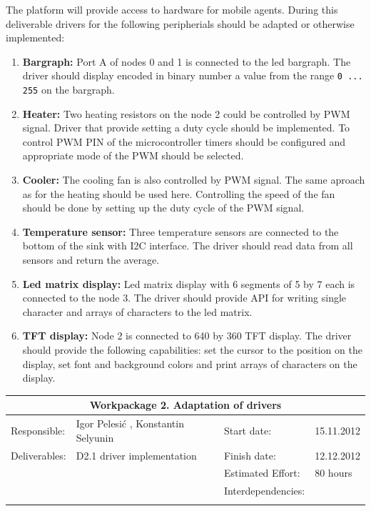 \documentclass{scrreprt}
\begin{document}
The platform will provide access to hardware for mobile agents.
During this deliverable drivers for the following peripherials should be adapted or otherwise implemented:
\begin{enumerate}

\item{\textbf{Bargraph:} Port A of nodes 0 and 1 is connected to the led bargraph.
The driver should display encoded in binary number a value from the range \texttt{0 ... 255} on the bargraph.
}


\item{\textbf{Heater:} Two heating resistors on the node 2 could be controlled by PWM signal.
Driver that provide setting a duty cycle should be implemented.
To control PWM PIN of the microcontroller timers should be configured and appropriate mode of the PWM should be selected.
}

\item{\textbf{Cooler:} The cooling fan is also controlled by PWM signal.
The same aproach as for the heating should be used here.
Controlling the speed of the fan should be done by setting up the duty cycle of the PWM signal.
}

\item{\textbf{Temperature sensor:} 
Three temperature sensors are connected to the bottom of the sink with I2C interface.
The driver should read data from all sensors and return the average.
}

\item{\textbf{Led matrix display:} 
Led matrix display with 6 segments of 5 by 7 each is connected to the node 3.
The driver should provide API for writing single character and arrays of characters to the led matrix.
}

\item{\textbf{TFT display:} 
Node 2 is connected to 640 by 360 TFT display.
The driver should provide the following capabilities: 
set the cursor to the position on the display,
set font and background colors and print arrays of characters on the display.
}
\end{enumerate}

\vspace{0.2in}
\begin{tabular}{|ll|ll|}
\hline \multicolumn{4}{|c|}{\textbf{Workpackage 2. Adaptation of drivers}}\\
\hline
Responsible:	&  Igor Pelesi\'c , Konstantin Selyunin	& Start date:		& 15.11.2012 \\
Deliverables:	&  D2.1 driver implementation		& Finish date:	 	& 12.12.2012\\
		&  					& Estimated Effort: 	& 80 hours \\
		&  					& Interdependencies:	& 	\\
		&  					& 			& 	\\
\hline
\end{tabular}
\end{document}
